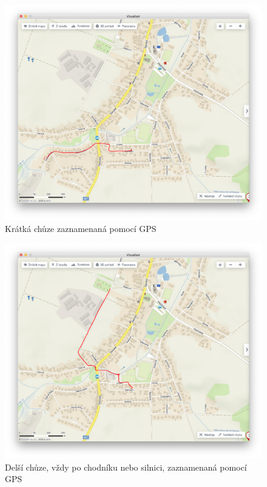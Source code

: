 \documentclass[czech, bachelor]{diploma}
\begin{document}
\begin{figure}
    \centering
    \includegraphics[width=1\textwidth]{Figures/domzolsiny.png}
    \caption{Krátká chůze zaznamenaná pomocí GPS}
    \label{fig:domzolsiny-fullsize}
\end{figure}

\begin{figure}
    \centering
    \includegraphics[width=1\textwidth]{Figures/hrbitov.png}
    \caption{Delší chůze, vždy po chodníku nebo silnici, zaznamenaná pomocí GPS}
    \label{fig:hrbitov-fullsize}
\end{figure}
\end{document}
